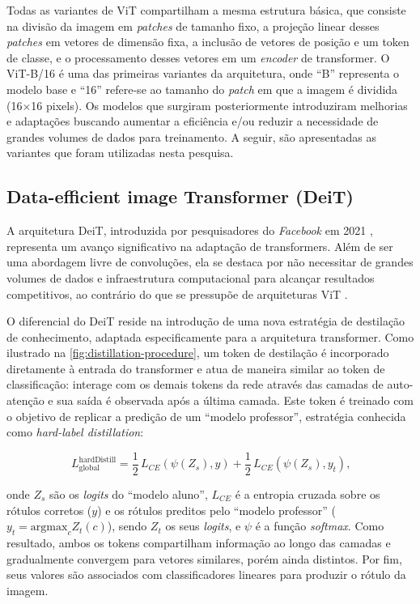 Todas as variantes de ViT compartilham a mesma estrutura básica, que consiste na divisão da imagem em \textit{patches} de tamanho fixo, a projeção linear desses \textit{patches} em vetores de dimensão fixa, a inclusão de vetores de posição e um token de classe, e o processamento desses vetores em um \textit{encoder} de transformer. O ViT-B/16 \cite{Dosovitskiy2021} é uma das primeiras variantes da arquitetura, onde ``B'' representa o modelo base e ``16'' refere-se ao tamanho do \textit{patch} em que a imagem é dividida (16×16 pixels). Os modelos que surgiram posteriormente introduziram melhorias e adaptações buscando aumentar a eficiência e/ou reduzir a necessidade de grandes volumes de dados para treinamento. A seguir, são apresentadas as variantes que foram utilizadas nesta pesquisa.

\subsection{Data-efficient image Transformer (DeiT)}

A arquitetura DeiT, introduzida por pesquisadores do \textit{Facebook} em 2021 \cite{Touvron2021}, representa um avanço significativo na adaptação de transformers. Além de ser uma abordagem livre de convoluções, ela se destaca por não necessitar de grandes volumes de dados e infraestrutura computacional para alcançar resultados competitivos, ao contrário do que se pressupõe de arquiteturas ViT \cite{Dosovitskiy2021}.

O diferencial do DeiT reside na introdução de uma nova estratégia de destilação de conhecimento, adaptada especificamente para a arquitetura transformer. Como ilustrado na \autoref{fig:distillation-procedure}, um token de destilação é incorporado diretamente à entrada do transformer e atua de maneira similar ao token de classificação: interage com os demais tokens da rede através das camadas de auto-atenção e sua saída é observada após a última camada. Este token é treinado com o objetivo de replicar a predição de um ``modelo professor'', estratégia conhecida como \textit{hard-label distillation}:

\begin{equation}
    L_{\text{global}}^{\text{hardDistill}} = \frac{1}{2} \, L_{CE}\left( \psi(Z_s), y \right) + \frac{1}{2} \, L_{CE}\left( \psi(Z_s), y_t \right) \text{,}
\end{equation}

onde $Z_s$ são os \textit{logits} do ``modelo aluno'', $L_{CE}$ é a entropia cruzada sobre os rótulos corretos ($y$) e os rótulos preditos pelo ``modelo professor'' ($y_t = \text{argmax}_c Z_t(c)$), sendo $Z_t$ os seus \textit{logits}, e $\psi$ é a função \textit{softmax}. Como resultado, ambos os tokens compartilham informação ao longo das camadas e gradualmente convergem para vetores similares, porém ainda distintos. Por fim, seus valores são associados com classificadores lineares para produzir o rótulo da imagem.

